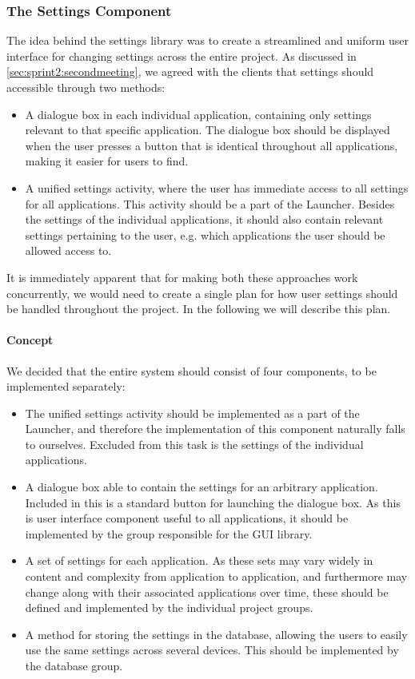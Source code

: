 \subsubsection{The Settings Component}
The idea behind the settings library was to create a streamlined and uniform user interface for changing settings across the entire \giraf project. As discussed in \cref{sec:sprint2:secondmeeting}, we agreed with the clients that settings should accessible through two methods:
\begin{itemize}
	\item A dialogue box in each individual application, containing only settings relevant to that specific application. The dialogue box should be displayed when the user presses a button that is identical throughout all \giraf applications, making it easier for users to find.
	\item A unified settings activity, where the user has immediate access to all settings for all \giraf applications. This activity should be a part of the Launcher. Besides the settings of the individual applications, it should also contain relevant settings pertaining to the user, e.g. which applications the user should be allowed access to.
\end{itemize}

It is immediately apparent that for making both these approaches work concurrently, we would need to create a single plan for how user settings should be handled throughout the \giraf project. In the following we will describe this plan.

\paragraph{Concept}
We decided that the entire system should consist of four components, to be implemented separately:
\begin{itemize}
	\item The unified settings activity should be implemented as a part of the Launcher, and therefore the implementation of this component naturally falls to ourselves. Excluded from this task is the settings of the individual applications.
	\item A dialogue box able to contain the settings for an arbitrary \giraf application. Included in this is a standard button for launching the dialogue box. As this is user interface component useful to all applications, it should be implemented by the group responsible for the \giraf GUI library.
	\item A set of settings for each \giraf application. As these sets may vary widely in content and complexity from application to application, and furthermore may change along with their associated applications over time, these should be defined and implemented by the individual project groups. 
	\item A method for storing the settings in the database, allowing the users to easily use the same settings across several devices. This should be implemented by the database group. 
\end{itemize}

